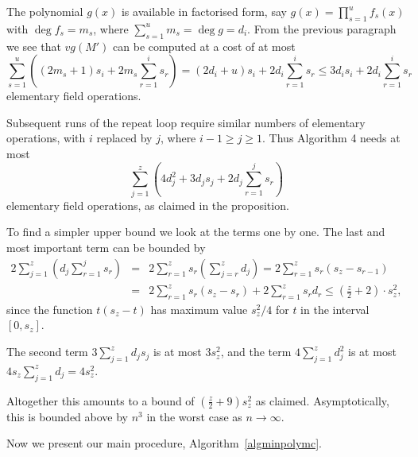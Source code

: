 \enlargethispage{1\baselineskip}
The polynomial $g(x)$ is available in factorised form,
say $g(x)=\prod_{s=1}^uf_s(x)$ with $\deg f_s=m_s$,
where $\sum_{s=1}^um_s=\deg g=d_i$. From the previous
paragraph we see that $vg(M')$ can be computed at a cost of at most
\[
\sum_{s=1}^u\left((2m_s+1)s_i +2m_s\sum_{r=1}^i s_r \right)
=(2d_i+u)s_i+2d_i\sum_{r=1}^is_r \leq 3d_is_i+2d_i\sum_{r=1}^is_r
\]
elementary field operations.

Subsequent runs of the repeat loop require similar numbers of elementary
operations, with $i$ replaced by $j$, where $i-1\geq j\geq 1$.
Thus Algorithm 4 needs at most
\[
\sum_{j=1}^z \left( 4d_j^2  + 3d_j s_j + 2d_j 
\sum_{r=1}^j s_r \right)
\]
elementary field operations, as claimed in the proposition.

To find a simpler upper bound we look at the terms one by one. The
last and most important term can be bounded by
\begin{eqnarray*}
  2\sum_{j=1}^z \left( d_j \sum_{r=1}^j s_r \right)
    &=& 2 \sum_{r=1}^z s_r \left(\sum_{j=r}^z d_j\right)
    = 2 \sum_{r=1}^z s_r (s_z - s_{r-1}) \\
    &=& 2 \sum_{r=1}^z s_r (s_z - s_r) + 2 \sum_{r=1}^z s_r d_r
    \le (\frac{z}{2}+2) \cdot s_z^2,
\end{eqnarray*}
since the function $t(s_z-t)$ has maximum value $s_z^2/4$
for $t$ in the interval $[0,s_z]$.

The second term $3\sum_{j=1}^z d_j s_j$ is at most $3s_z^2$,
and the term
$4 \sum_{j=1}^z d_j^2$ is at most $4s_z\sum_{j=1}^z d_j = 4s_z^2$.

Altogether this amounts to a bound of $(\frac{z}{2}+9)s_z^2$ as claimed.
Asymptotically, this is bounded above by $n^3$ in the worst case as
$n \to \infty$.
\proofend

\smallskip
Now we present our main procedure, Algorithm~\ref{algminpolymc}. 

